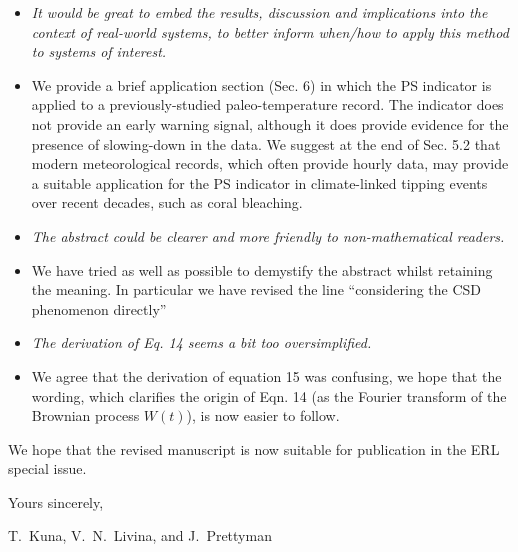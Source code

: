 \documentclass[12pt, a4paper]{article}
\begin{document}
\begin{itemize}

\item[\bf Comment 1.]  %
{\sl It would be great to embed the results, discussion and implications into the context of real-world systems, to better inform when/how to apply this method to systems of interest.
}

\item[\bf Response.] We provide a brief application section (Sec. 6) in which the PS indicator is applied to a previously-studied paleo-temperature record. The indicator does not provide an early warning signal, although it does provide evidence for the presence of slowing-down in the data. We suggest at the end of Sec. 5.2 that modern meteorological records, which often provide hourly data, may provide a suitable application for the PS indicator in climate-linked tipping events over recent decades, such as coral bleaching.

\item[\bf Comment 2.]
{\sl The abstract could be clearer and more friendly to non-mathematical readers.
}

\item[\bf Response.] We have tried as well as possible to demystify the abstract whilst retaining the meaning. In particular we have revised the line ``considering the CSD phenomenon directly''

\item[\bf Comment 3.] %
{\sl The derivation of Eq. 14 seems a bit too oversimplified.
}

\item[\bf Response.] We agree that the derivation of equation 15 was confusing, we hope that the wording, which clarifies the origin of Eqn. 14 (as the Fourier transform of the Brownian process $W(t)$), is now easier to follow. 


\end{itemize}

\vspace{7mm}

\noindent
We hope that the revised manuscript is now suitable for publication
in the ERL special issue.

\vspace{5mm}

\noindent
Yours sincerely,

\vspace{1mm}

\noindent
T.~Kuna, V.~N.~Livina, and J.~Prettyman
\end{document}
